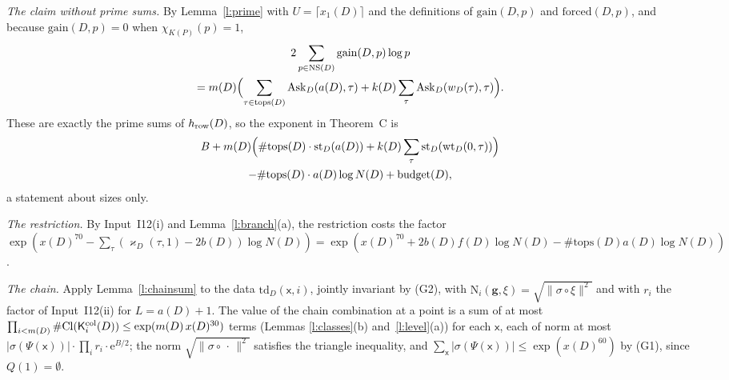 \documentclass[11pt,a4paper]{article}
\makeatletter
\theoremstyle{plainx}
\theoremstyle{uprightx}
\renewenvironment{proof}[1][Proof]{\par\pushQED{\qed}\normalfont\topsep0pt\partopsep0pt
  \trivlist\item[\hskip\labelsep\itshape #1.]\ignorespaces}{\popQED\endtrivlist\@endpefalse}
\newcommand{\ee}{\mathrm{e}}
\newcommand{\KP}[1]{K(#1)}
\newcommand{\chiK}[1]{\chi_{\KP{#1}}}
\newcommand{\xD}[1]{x(#1)}
\newcommand{\xoD}[1]{x_1(#1)}
\newcommand{\bD}[1]{b(#1)}
\newcommand{\mD}[1]{m(#1)}
\newcommand{\fD}[1]{f(#1)}
\newcommand{\kD}[1]{k(#1)}
\newcommand{\aD}[1]{a(#1)}
\newcommand{\tops}[1]{\mathrm{tops}(#1)}
\newcommand{\nomW}[2]{w_{#1}(#2)}
\newcommand{\bud}[1]{\mathrm{budget}(#1)}
\newcommand{\wtD}[3]{\mathrm{wt}_{#1}(#2,#3)}
\newcommand{\ND}[1]{N(#1)}
\newcommand{\Ask}[3]{\mathrm{Ask}_{#1}(#2,#3)}
\newcommand{\jsz}[2]{\mathrm{st}_{#1}(#2)}
\newcommand{\forced}[2]{\mathrm{forced}(#1,#2)}
\newcommand{\gain}[2]{\mathrm{gain}(#1,#2)}
\newcommand{\kap}[3]{\varkappa_{#1}(#2,#3)}
\newcommand{\td}[3]{\mathrm{td}_{#1}(#2,#3)}
\newcommand{\Cl}[1]{\mathrm{Cl}(#1)}
\newcommand{\wn}[1]{\|#1\|^{2}}
\makeatother
\begin{document}
\begin{proof}[Proof of Theorem C]
\emph{The claim without prime sums.} By Lemma~\ref{l:prime} with $U=\lceil \xoD{D}\rceil$ and the definitions of
$\gain{D}{p}$ and $\forced{D}{p}$, and because $\gain{D}{p}=0$ when $\chiK{P}(p)=1$,
\begin{multline*}2\sum_{p\in\nsp{D}}\gain{D}{p}\log p\\=\mD{D}\Bigl(\sum_{\tau\in\tops{D}}\Ask{D}{\aD{D}}{\tau}+\kD{D}\sum_{\tau}\Ask{D}{\nomW{D}{\tau}}{\tau}\Bigr).\end{multline*}
These are exactly the prime sums of $h_{\mathrm{row}}(D)$, so the exponent in Theorem~C is
\begin{multline*}
B+\mD{D}\Bigl(\#\tops{D}\cdot\jsz{D}{\aD{D}}+\kD{D}\sum_{\tau}\jsz{D}{\wtD{D}{0}{\tau}}\Bigr)\\
-\#\tops{D}\cdot\aD{D}\log\ND{D}+\bud{D},
\end{multline*}
a statement about sizes only.

\emph{The restriction.} By Input~I12(i) and Lemma~\ref{l:branch}(a), the restriction costs the factor
$\exp(\xD{D}^{70}-\sum_\tau(\kap{D}{\tau}{1}-2\bD{D})\log\ND{D})=\exp(\xD{D}^{70}+2\bD{D}\fD{D}\log\ND{D}-\#\tops{D}\aD{D}\log\ND{D})$.

\emph{The chain.} Apply Lemma~\ref{l:chainsum} to the data $\td{D}{\mathsf{x}}{i}$, jointly invariant by (G2),
with $\mathrm{N}_i(\mathbf{g},\xi)=\sqrt{\wn{\sigma\circ\xi}}$ and with $r_i$ the factor of Input~I12(ii) for
$L=\aD{D}+1$. The value of the chain combination at a point is a sum of at most
$\prod_{i<\mD{D}}\#\Cl{\colL{D}{i}}\le\exp(\mD{D}\,\xD{D}^{30})$ terms (Lemmas \ref{l:classes}(b) and~\ref{l:level}(a)) for each
$\mathsf{x}$, each of norm at most $|\sigma(\Psi(\mathsf{x}))|\cdot\prod_ir_i\cdot\ee^{B/2}$; the norm
$\sqrt{\wn{\sigma\circ\,\cdot\,}}$ satisfies the triangle inequality, and
$\sum_{\mathsf{x}}|\sigma(\Psi(\mathsf{x}))|\le\exp(\xD{D}^{60})$ by (G1), since $Q(1)=\emptyset$.


\end{proof}
\end{document}
